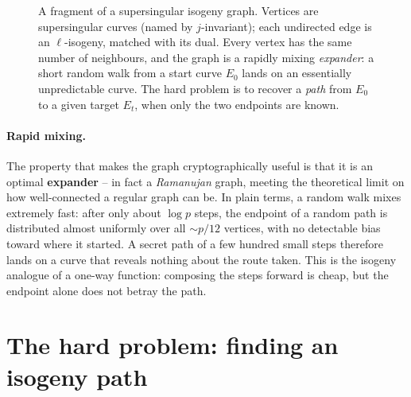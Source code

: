 \begin{figure}[H]
\centering
{}
\caption{A fragment of a supersingular isogeny graph. Vertices are supersingular curves (named by $j$-invariant); each undirected edge is an $\ell$-isogeny, matched with its dual. Every vertex has the same number of neighbours, and the graph is a rapidly mixing \emph{expander}: a short random walk from a start curve $E_0$ lands on an essentially unpredictable curve. The hard problem is to recover a \emph{path} from $E_0$ to a given target $E_t$, when only the two endpoints are known.}
\label{fig:isogeny-graph}
\end{figure}

\paragraph{Rapid mixing.}
The property that makes the graph cryptographically useful is that it is an optimal \textbf{expander} -- in fact a \emph{Ramanujan} graph, meeting the theoretical limit on how well-connected a regular graph can be. In plain terms, a random walk mixes extremely fast: after only about $\log p$ steps, the endpoint of a random path is distributed almost uniformly over all $\sim p/12$ vertices, with no detectable bias toward where it started. A secret path of a few hundred small steps therefore lands on a curve that reveals nothing about the route taken. This is the isogeny analogue of a one-way function: composing the steps forward is cheap, but the endpoint alone does not betray the path.

\section{The hard problem: finding an isogeny path}

